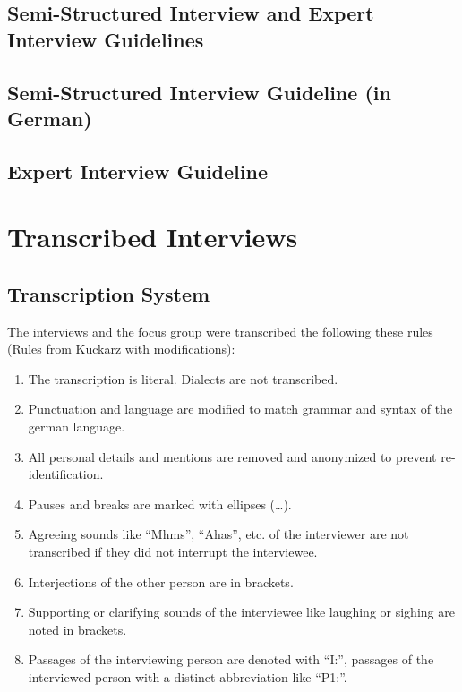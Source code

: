 \clearpage
\newpage
\onecolumn

\setcounter{section}{0}
 \setcounter{subsection}{0}
 \def\thesection{Appendix \Alph{section}}
 \def\thesubsection{Appendix \Alph{section}.\arabic{subsection}}

\begin{landscape}

\section{Semi-Structured Interview and Expert Interview Guidelines}
\subsection{Semi-Structured Interview Guideline (in German)}




\end{landscape}
\newpage

\twocolumn

\subsection{Expert Interview Guideline}




\section{Transcribed Interviews}

\subsection{Transcription System}
The interviews and the focus group were transcribed the following these rules (Rules from Kuckarz \cite{kuckartz2007} with modifications):
\begin{enumerate}
    \item The transcription is literal. Dialects are not transcribed.
    \item Punctuation and language are modified to match grammar and syntax of the german language.
    \item All personal details and mentions are removed and anonymized to prevent re-identification.
    \item Pauses and breaks are marked with ellipses (\dots).
    \item Agreeing sounds like ``Mhms'', ``Ahas'', etc. of the interviewer are not transcribed if they did not interrupt the interviewee.
    \item Interjections of the other person are in brackets.
    \item Supporting or clarifying sounds of the interviewee like laughing or sighing are noted in brackets.
    \item Passages of the interviewing person are denoted with ``I:'', passages of the interviewed person with a distinct abbreviation like ``P1:''.
\end{enumerate}

